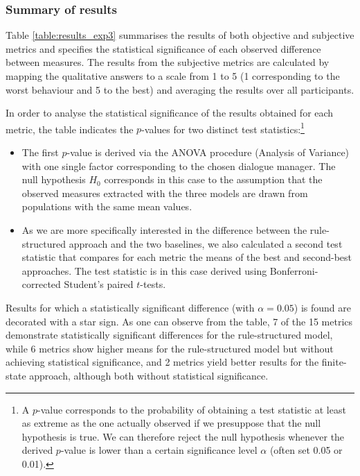 \subsubsection*{Summary of results}

Table \ref{table:results_exp3} summarises the results of both objective and subjective metrics and specifies the statistical significance of each observed difference between measures.  The results from the subjective metrics are calculated by mapping the qualitative answers to a scale from 1 to 5 (1 corresponding to the worst behaviour and 5 to the best) and averaging the results over all participants. 

In order to analyse the statistical significance of the results obtained for each metric, the table indicates the $p$-values for two distinct test statistics:\footnote{A $p$-value corresponds to the probability of obtaining a test statistic at least as extreme as the one actually observed if we presuppose that the null hypothesis is true.  We can therefore reject the null hypothesis whenever the derived $p$-value is lower than a certain significance level $\alpha$ (often set 0.05 or 0.01).}
\begin{itemize}
\item The first $p$-value is derived via the ANOVA procedure (Analysis of Variance) with one single factor corresponding to the chosen dialogue manager. The null hypothesis $H_0$ corresponds in this case to the assumption that the observed measures extracted with the three models are drawn from populations with the same mean values.  

\item As we are more specifically interested in the difference between the rule-structured approach and the two baselines, we also calculated a second test statistic that compares for each metric the means of the best and second-best approaches. The test statistic is in this case derived using Bonferroni-corrected Student's paired $t$-tests.

\end{itemize}

Results for which a statistically significant difference (with $\alpha = 0.05$) is found are decorated with a star sign. As one can observe from the table, 7 of the 15 metrics demonstrate statistically significant differences for the rule-structured model, while 6 metrics show higher means for the rule-structured model but without achieving statistical significance, and 2 metrics yield better results for the finite-state approach, although both without statistical significance. 

